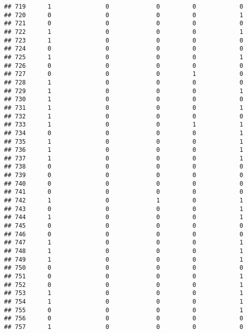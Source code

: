 \documentclass[]{article}
\begin{document}
\begin{verbatim}
## 719      1               0             0         0            0
## 720      0               0             0         0            1
## 721      0               0             0         0            0
## 722      1               0             0         0            1
## 723      1               0             0         0            0
## 724      0               0             0         0            0
## 725      1               0             0         0            1
## 726      0               0             0         0            0
## 727      0               0             0         1            0
## 728      1               0             0         0            0
## 729      1               0             0         0            1
## 730      1               0             0         0            0
## 731      1               0             0         0            1
## 732      1               0             0         0            0
## 733      1               0             0         1            1
## 734      0               0             0         0            1
## 735      1               0             0         0            1
## 736      1               0             0         0            1
## 737      1               0             0         0            1
## 738      0               0             0         0            0
## 739      0               0             0         0            0
## 740      0               0             0         0            0
## 741      0               0             0         0            0
## 742      1               0             1         0            1
## 743      0               0             0         0            1
## 744      1               0             0         0            1
## 745      0               0             0         0            0
## 746      0               0             0         0            0
## 747      1               0             0         0            1
## 748      1               0             0         0            1
## 749      1               0             0         0            1
## 750      0               0             0         0            0
## 751      0               0             0         0            1
## 752      0               0             0         0            1
## 753      1               0             0         0            1
## 754      1               0             0         0            1
## 755      0               0             0         0            1
## 756      0               0             0         0            0
## 757      1               0             0         0            0

\end{verbatim}
\end{document}
